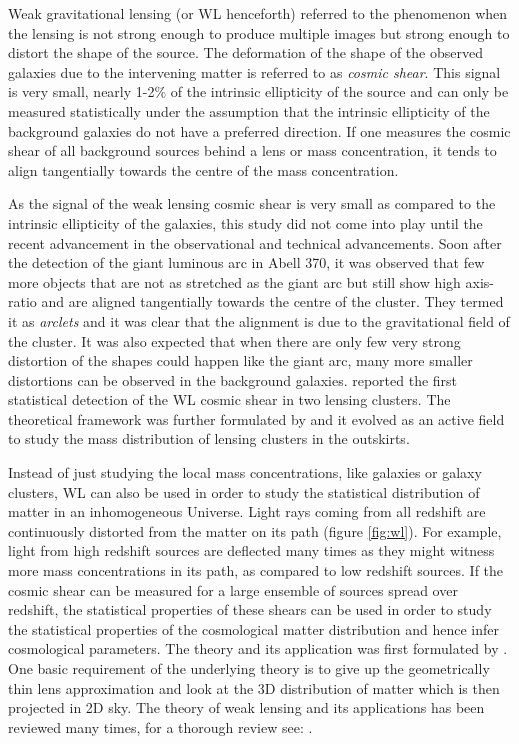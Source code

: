Weak gravitational lensing (or WL henceforth) referred to the phenomenon when 
the lensing is not strong enough to produce multiple images but strong enough
to distort the shape of the source. The deformation of the shape of the observed galaxies
due to the intervening matter is referred to as {\it cosmic shear}. This
signal is very small, nearly 1-2$\%$ of the intrinsic ellipticity of the source 
and can only be measured statistically under the assumption that the intrinsic 
ellipticity of the background galaxies do not have a preferred direction. If one 
measures the cosmic shear of all background sources behind a lens or mass concentration,
it tends to align tangentially towards the centre of the mass concentration. 

As the signal of the weak lensing cosmic shear is very small as compared to the 
intrinsic ellipticity of the galaxies, this study did not come into play until
the recent advancement in the observational and technical advancements. Soon 
after the detection of the giant luminous arc in Abell 370, it was observed
that few more objects that are not as stretched as the giant arc but still show
high axis-ratio and are aligned tangentially towards the centre of the cluster. They
termed it as {\it arclets} and it was clear that the alignment is due to the 
gravitational field of the cluster. It was also expected that when there are
only few very strong distortion of the shapes could happen like the giant 
arc, many more smaller distortions can be observed in the background galaxies.
\cite{1990ApJ...349L...1T} reported the first statistical detection of the WL
cosmic shear in two lensing clusters. The theoretical framework was further
formulated by \cite{1993ApJ...404..441K} and it evolved as an active field
to study the mass distribution of lensing clusters in the outskirts. 

Instead of just studying the local mass concentrations, like galaxies or galaxy
clusters, WL can also be used in order to study the statistical distribution of matter
in an inhomogeneous Universe. Light rays coming from all redshift are continuously
distorted from the matter on its path (figure \ref{fig:wl}). 
For example, light from high redshift sources
are deflected many times as they might witness more mass concentrations in its path, 
as compared to low redshift sources. If the cosmic shear can be measured for 
a large ensemble of sources spread over redshift, the statistical properties
of these shears can be used in order to study the statistical properties of the
cosmological matter distribution and hence infer cosmological parameters. The 
theory and its application was first formulated by \cite{1991MNRAS.251..600B}.
One basic requirement of the underlying theory is to give up the geometrically
thin lens approximation and look at the 3D distribution of matter which 
is then projected in 2D sky. The theory of weak lensing and its applications
has been reviewed many times, for a thorough review see: \cite{}.

